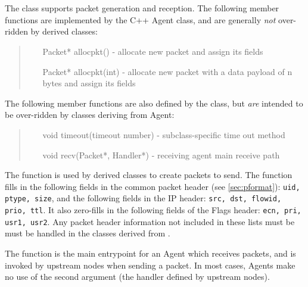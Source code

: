 \section{}

The  class supports packet generation and reception.
The following member functions are implemented by the C++ Agent class, and are
generally {\em not} over-ridden by derived classes:
\begin{tt}
\begin{quote}
\begin{itemize}
\item[Packet* allocpkt()] - allocate new packet and assign its fields
\item[Packet* allocpkt(int)] - allocate new packet with a data payload of n bytes and assign its fields
\end{itemize}
\end{quote}
\end{tt}
The following member functions are also defined by the  class,
but {\em are} intended to be over-ridden by classes deriving from Agent:
\begin{tt}
\begin{quote}
\begin{itemize}
        \item[void timeout(timeout number)] - subclass-specific time out method 
        \item[void recv(Packet*, Handler*)] - receiving agent main receive path
\end{itemize}
\end{quote}
\end{tt}

The  function is used by derived classes to create
packets to send.
The function fills in the following fields in the common packet
header (see \ref{sec:pformat}): {\tt uid, ptype, size}, and the
following fields in the IP header: {\tt src, dst, flowid, prio, ttl}.
It also zero-fills in the following fields of the Flags header:
{\tt ecn, pri, usr1, usr2}.
Any packet header information not included in these lists must
be must be handled in the classes derived from .

The  function is the main entrypoint for an
Agent which receives packets, and
is invoked by upstream nodes when sending a packet.
In most cases, Agents make no use of the second argument (the handler
defined by upstream nodes).

\section{}

